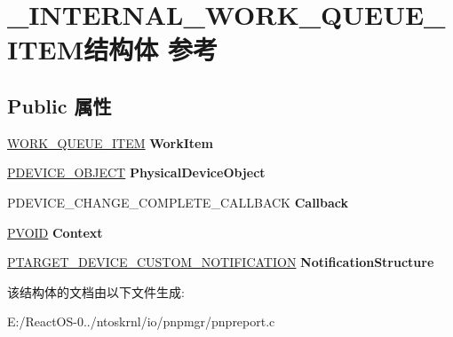 \hypertarget{struct___i_n_t_e_r_n_a_l___w_o_r_k___q_u_e_u_e___i_t_e_m}{}\section{\+\_\+\+I\+N\+T\+E\+R\+N\+A\+L\+\_\+\+W\+O\+R\+K\+\_\+\+Q\+U\+E\+U\+E\+\_\+\+I\+T\+E\+M结构体 参考}
\label{struct___i_n_t_e_r_n_a_l___w_o_r_k___q_u_e_u_e___i_t_e_m}
\subsection*{Public 属性}
\begin{DoxyCompactItemize}
\item 
\mbox{\label{struct___i_n_t_e_r_n_a_l___w_o_r_k___q_u_e_u_e___i_t_e_m_afcea56c76f955477cbaf2098efc2ded4}} 
\hyperlink{struct___w_o_r_k___q_u_e_u_e___i_t_e_m}{W\+O\+R\+K\+\_\+\+Q\+U\+E\+U\+E\+\_\+\+I\+T\+EM} {\bfseries Work\+Item}
\item 
\mbox{\label{struct___i_n_t_e_r_n_a_l___w_o_r_k___q_u_e_u_e___i_t_e_m_a68a46ba0b40dbb82d8e9aeff4c6bfaf9}} 
\hyperlink{struct___d_e_v_i_c_e___o_b_j_e_c_t}{P\+D\+E\+V\+I\+C\+E\+\_\+\+O\+B\+J\+E\+CT} {\bfseries Physical\+Device\+Object}
\item 
\mbox{\label{struct___i_n_t_e_r_n_a_l___w_o_r_k___q_u_e_u_e___i_t_e_m_abffd647b74f4ae929dae1422765bdecf}} 
P\+D\+E\+V\+I\+C\+E\+\_\+\+C\+H\+A\+N\+G\+E\+\_\+\+C\+O\+M\+P\+L\+E\+T\+E\+\_\+\+C\+A\+L\+L\+B\+A\+CK {\bfseries Callback}
\item 
\mbox{\label{struct___i_n_t_e_r_n_a_l___w_o_r_k___q_u_e_u_e___i_t_e_m_a51c494b09fac6b4bdcc2ba54e296da2b}} 
\hyperlink{interfacevoid}{P\+V\+O\+ID} {\bfseries Context}
\item 
\mbox{\label{struct___i_n_t_e_r_n_a_l___w_o_r_k___q_u_e_u_e___i_t_e_m_adc98c57d701ae58b8ce05e983eb998b4}} 
\hyperlink{struct___t_a_r_g_e_t___d_e_v_i_c_e___c_u_s_t_o_m___n_o_t_i_f_i_c_a_t_i_o_n}{P\+T\+A\+R\+G\+E\+T\+\_\+\+D\+E\+V\+I\+C\+E\+\_\+\+C\+U\+S\+T\+O\+M\+\_\+\+N\+O\+T\+I\+F\+I\+C\+A\+T\+I\+ON} {\bfseries Notification\+Structure}
\end{DoxyCompactItemize}


该结构体的文档由以下文件生成\+:\begin{DoxyCompactItemize}
\item 
E\+:/\+React\+O\+S-\/0../ntoskrnl/io/pnpmgr/pnpreport.\+c\end{DoxyCompactItemize}
